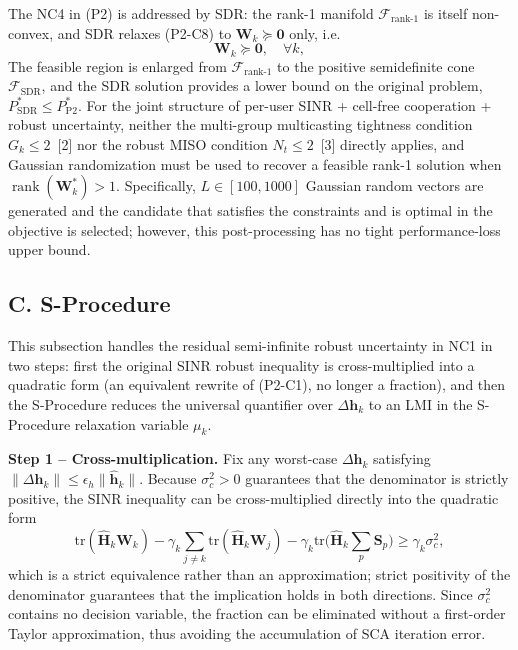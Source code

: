 \documentclass[12pt,a4paper]{article}
\newcommand{\vect}[1]{\mathbf{#1}}
\newcommand{\mat}[1]{\mathbf{#1}}
\newcommand{\tr}{\text{tr}}
\DeclareMathOperator{\rank}{rank}
\begin{document}
The NC4 in (P2) is addressed by SDR: the rank-1 manifold $\mathcal{F}_{\text{rank-1}}$ is itself non-convex, and SDR relaxes (P2-C8) to $\mat{W}_k \succeq \mat{0}$ only, i.e.
\begin{equation}
\mat{W}_k \succeq \mat{0}, \quad \forall k, \tag{S1.1}
\end{equation}
The feasible region is enlarged from $\mathcal{F}_{\text{rank-1}}$ to the positive semidefinite cone $\mathcal{F}_{\text{SDR}}$, and the SDR solution provides a lower bound on the original problem, $P_{\text{SDR}}^* \leq P_{\text{P2}}^*$. For the joint structure of per-user SINR + cell-free cooperation + robust uncertainty, neither the multi-group multicasting tightness condition $G_k \leq 2$~[2] nor the robust MISO condition $N_t \leq 2$~[3] directly applies, and Gaussian randomization must be used to recover a feasible rank-1 solution when $\rank(\mat{W}_k^*) > 1$. Specifically, $L \in [100, 1000]$ Gaussian random vectors are generated and the candidate that satisfies the constraints and is optimal in the objective is selected; however, this post-processing has no tight performance-loss upper bound.

\subsection*{C. S-Procedure}

This subsection handles the residual semi-infinite robust uncertainty in NC1 in two steps: first the original SINR robust inequality is cross-multiplied into a quadratic form (an equivalent rewrite of (P2-C1), no longer a fraction), and then the S-Procedure reduces the universal quantifier over $\Delta\vect{h}_k$ to an LMI in the S-Procedure relaxation variable $\mu_k$.

\textbf{Step 1 -- Cross-multiplication.} Fix any worst-case $\Delta\vect{h}_k$ satisfying $\|\Delta\vect{h}_k\| \leq \epsilon_h \|\hat{\vect{h}}_k\|$. Because $\sigma_c^2 > 0$ guarantees that the denominator is strictly positive, the SINR inequality can be cross-multiplied directly into the quadratic form
\begin{equation}
\tr(\hat{\mat{H}}_k \mat{W}_k) - \gamma_k \sum_{j \neq k} \tr(\hat{\mat{H}}_k \mat{W}_j) - \gamma_k \tr\Big(\hat{\mat{H}}_k \sum_p \mat{S}_p\Big) \geq \gamma_k \sigma_c^2, \tag{S2.1}
\end{equation}
which is a strict equivalence rather than an approximation; strict positivity of the denominator guarantees that the implication holds in both directions. Since $\sigma_c^2$ contains no decision variable, the fraction can be eliminated without a first-order Taylor approximation, thus avoiding the accumulation of SCA iteration error.
\end{document}
